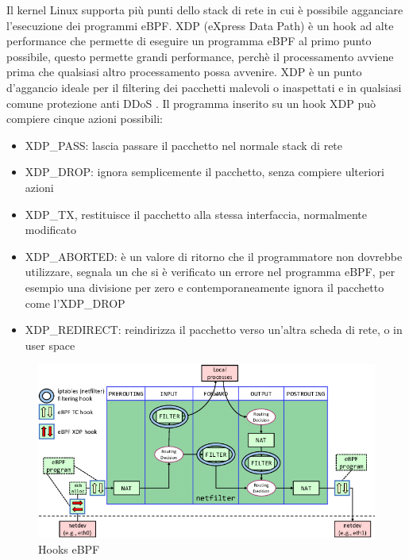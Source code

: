 Il kernel Linux supporta più punti dello stack di rete in cui è possibile agganciare l'esecuzione dei programmi eBPF.
XDP (eXpress Data Path) è un hook ad alte performance che permette di eseguire un programma eBPF al primo punto possibile, questo permette grandi performance, perchè il processamento avviene prima che qualsiasi altro processamento possa avvenire. XDP è un punto d'aggancio ideale per il filtering dei pacchetti malevoli o inaspettati e in qualsiasi comune protezione anti DDoS \cite{cilium_xdp}.
Il programma inserito su un hook XDP può compiere cinque azioni possibili:
\begin{itemize}
    \item XDP\_PASS: lascia passare il pacchetto nel normale stack di rete
    \item XDP\_DROP: ignora semplicemente il pacchetto, senza compiere ulteriori azioni
    \item XDP\_TX, restituisce il pacchetto alla stessa interfaccia, normalmente modificato
    \item XDP\_ABORTED: è un valore di ritorno che il programmatore non dovrebbe utilizzare, segnala un che si è verificato un errore nel programma eBPF, per esempio una divisione per zero e contemporaneamente ignora il pacchetto come l'XDP\_DROP
    \item XDP\_REDIRECT: reindirizza il pacchetto verso un'altra scheda di rete, o in user space
\end{itemize}
\begin{figure}[]
    \label{fig:hooks}
    \includegraphics[width=\hsize]{images/mitigazione/hooks.png}
    \caption{Hooks eBPF}
    \centering
\end{figure}

